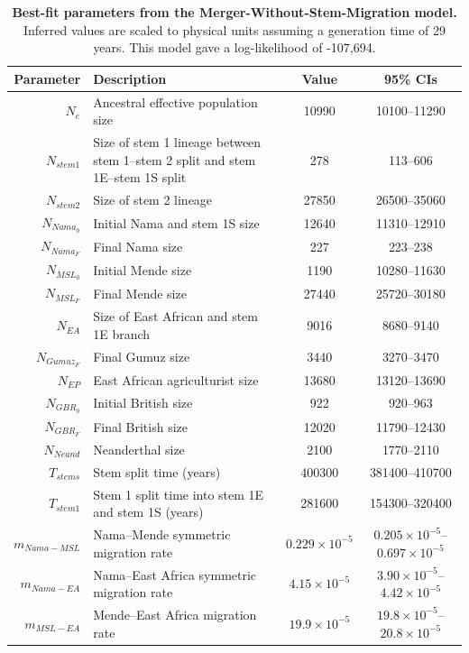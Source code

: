 \documentclass[]{article}
\begin{document}
\begin{table}[ht]
\caption{
    \label{tab:supp-merger-without-stem-migration}
    \textbf{Best-fit parameters from the Merger-Without-Stem-Migration model.}
    Inferred values are scaled to physical units assuming a generation time of
    29 years. This model gave a log-likelihood of -107,694.
}
\centering
\begin{tabular}[t]{rP{8cm}cc}
    \toprule
    Parameter & Description & Value & 95\% CIs\\
    \midrule
    $N_e$ & Ancestral effective population size & 10990 & 10100--11290 \\
    $N_{stem1}$ & Size of stem 1 lineage between stem 1--stem 2 split and stem 1E--stem 1S split & 278 & 113--606 \\
    $N_{stem2}$ & Size of stem 2 lineage & 27850 & 26500--35060 \\
    $N_{Nama_0}$ & Initial Nama and stem 1S size & 12640 & 11310--12910 \\
    $N_{Nama_F}$ & Final Nama size & 227 & 223--238 \\
    $N_{MSL_0}$ & Initial Mende size & 1190 & 10280--11630 \\
    $N_{MSL_F}$ & Final Mende size & 27440 & 25720--30180 \\
    $N_{EA}$ & Size of East African and stem 1E branch & 9016 & 8680--9140 \\
    $N_{Gumuz_F}$ & Final Gumuz size & 3440 & 3270--3470 \\
    $N_{EP}$ & East African agriculturist size & 13680 & 13120--13690 \\
    $N_{GBR_0}$ & Initial British size & 922 & 920--963 \\
    $N_{GBR_F}$ & Final British size & 12020 & 11790--12430 \\
    $N_{Neand}$ & Neanderthal size & 2100 & 1770--2110 \\
    $T_{stems}$ & Stem split time (years) & 400300 & 381400--410700 \\
    $T_{stem1}$ & Stem 1 split time into stem 1E and stem 1S (years) & 281600 & 154300--320400 \\
    $m_{Nama-MSL}$ & Nama--Mende symmetric migration rate & $0.229\times10^{-5}$ & $0.205\times10^{-5}$--$0.697\times10^{-5}$ \\
    $m_{Nama-EA}$ & Nama--East Africa symmetric migration rate & $4.15\times10^{-5}$ & $3.90\times10^{-5}$--$4.42\times10^{-5}$ \\
    $m_{MSL-EA}$ & Mende--East Africa migration rate & $19.9\times10^{-5}$ & $19.8\times10^{-5}$--$20.8\times10^{-5}$ \\

\end{tabular}
\end{table}
\end{document}
